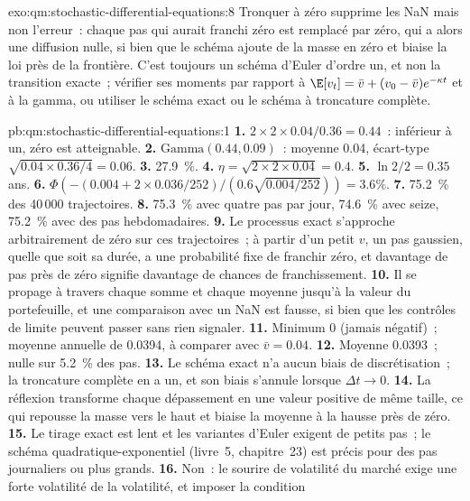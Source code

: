 \begin{solution}{exo:qm:stochastic-differential-equations:8}
Tronquer à zéro supprime les NaN mais non l'erreur~: chaque pas qui aurait franchi zéro est remplacé par
zéro, qui a alors une diffusion nulle, si bien que le schéma ajoute de la masse en zéro et biaise la loi près de la
frontière. C'est toujours un schéma d'Euler d'ordre un, et non la transition exacte~; vérifier ses moments
par rapport à $\E[v_t] = \bar v + (v_0 - \bar v)e^{-\kappa t}$ et à la  gamma, ou utiliser le schéma exact ou
le schéma à troncature complète.
\end{solution}

\begin{solution}{pb:qm:stochastic-differential-equations:1}
\textbf{1.} $2 \times 2 \times 0.04/0.36 = 0.44$~: inférieur à un, zéro est atteignable.
\textbf{2.} $\mathrm{Gamma}(0.44, 0.09)$~: moyenne 0.04, écart-type $\sqrt{0.04 \times 0.36/4} = 0.06$.
\textbf{3.} 27.9~\%.
\textbf{4.} $\eta = \sqrt{2 \times 2 \times 0.04} = 0.4$.
\textbf{5.} $\ln 2/2 = 0.35$ ans.
\textbf{6.} $\Phi(-(0.004 + 2 \times 0.036/252)/(0.6\sqrt{0.004/252})) = 3.6\%$.
\textbf{7.} 75.2~\% des 40\,000 trajectoires.
\textbf{8.} 75.3~\% avec quatre pas par jour, 74.6~\% avec seize, 75.2~\% avec des pas hebdomadaires.
\textbf{9.} Le processus exact s'approche arbitrairement de zéro sur ces trajectoires~; à partir d'un petit $v$, un
pas gaussien, quelle que soit sa durée, a une probabilité fixe de franchir zéro, et davantage de pas près de zéro signifie davantage de
chances de franchissement.
\textbf{10.} Il se propage à travers chaque somme et chaque moyenne jusqu'à la valeur du portefeuille, et une comparaison
avec un NaN est fausse, si bien que les contrôles de limite peuvent passer sans rien signaler.
\textbf{11.} Minimum 0 (jamais négatif)~; moyenne annuelle de 0.0394, à comparer avec $\bar v = 0.04$.
\textbf{12.} Moyenne 0.0393~; nulle sur 5.2~\% des pas.
\textbf{13.} Le schéma exact n'a aucun biais de discrétisation~; la troncature complète en a un, et son biais
s'annule lorsque $\Delta t \to 0$.
\textbf{14.} La réflexion transforme chaque dépassement en une valeur positive de même taille, ce qui repousse la masse
vers le haut et biaise la moyenne à la hausse près de zéro.
\textbf{15.} Le tirage exact est lent et les variantes d'Euler exigent de petits pas~; le
schéma quadratique-exponentiel (livre~5, chapitre~23) est précis pour des pas journaliers ou plus grands.
\textbf{16.} Non~: le sourire de volatilité du marché exige une forte volatilité de la volatilité, et imposer la condition

\end{solution}
